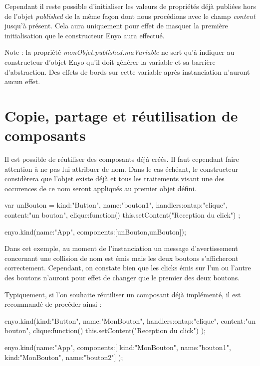 \documentclass[11pt,a4paper]{report}
\begin{document}

Cependant il reste possible d'initialiser les valeurs de propriétés 
déjà publiées hors de l'objet \emph{published} de la même façon dont nous procédions 
avec le champ \emph{content} jusqu'à présent. Cela aura uniquement pour effet de  masquer la première 
initialisation que le constructeur Enyo aura effectué.

Note : la propriété \emph{monObjet.published.maVariable} ne sert qu'à indiquer au 
constructeur d'objet Enyo qu'il doit générer la variable et sa barrière d'abstraction. 
Des effets de bords sur cette variable après instanciation n'auront aucun effet. 

\section{Copie, partage et réutilisation de composants}

Il est possible de réutiliser des composants déjà créés. Il faut cependant faire attention à ne pas
lui attribuer de nom. Dans le cas échéant, le constructeur considèrera que l'objet existe déjà et 
tous les traitements visant une des occurences de ce nom seront appliqués au premier objet défini.

\begin{JavaScript}
var unBouton = {kind:"Button", name:"bouton1", 
                handlers:{ontap:"clique"}, 
                content:"un bouton",
                clique:function(){
                  this.setContent("Reception du click")
                }
};

enyo.kind({name:"App", components:[unBouton,unBouton]});
\end{JavaScript}

Dans cet exemple, au moment de l'instanciation un message d'avertissement concernant une collision de nom 
est émis mais les deux boutons s'afficheront correctement. Cependant, on constate bien que les clicks 
émis sur l'un ou l'autre des boutons n'auront pour effet de changer que le premier des deux boutons.\\\medskip

Typiquement, si l'on souhaite réutiliser un composant déjà implémenté,
il est recommandé de procéder ainsi :

\begin{JavaScript}
enyo.kind({kind:"Button", name:"MonBouton", 
           handlers:{ontap:"clique"}, 
           content:"un bouton",
           clique:function(){
             this.setContent("Reception du click")
           }
});

enyo.kind({name:"App", 
           components:[
             {kind:"MonBouton", name:"bouton1"},
             {kind:"MonBouton", name:"bouton2"}]
});
\end{JavaScript}
\end{document}
